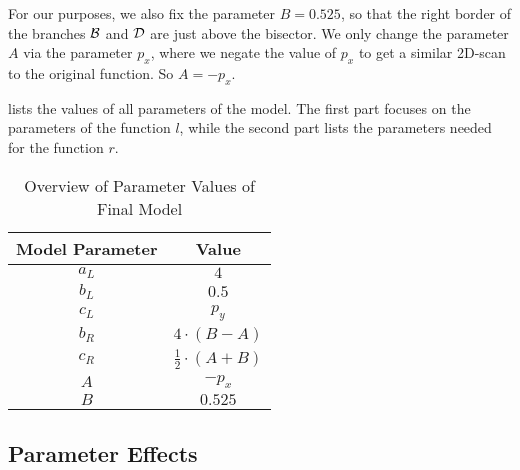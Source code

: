 For our purposes, we also fix the parameter $B = 0.525$, so that the right border of the branches $\mathcal{B}$ and $\mathcal{D}$ are just above the bisector.
We only change the parameter $A$ via the parameter $p_x$, where we negate the value of $p_x$ to get a similar 2D-scan to the original function.
So $A = -p_x$.

 lists the values of all parameters of the model.
The first part focuses on the parameters of the function $l$, while the second part lists the parameters needed for the function $r$.

\begin{table}
    \centering
    \begin{tabular}{|c|c|}
        \hline
        Model Parameter & Value                       \\ \hline \hline
        $a_L$           & $4$                         \\ \hline
        $b_L$           & $0.5$                       \\ \hline
        $c_L$           & $p_y$                       \\ \hline \hline
        $b_R$           & $4 \cdot (B - A)$           \\ \hline
        $c_R$           & $\frac{1}{2} \cdot (A + B)$ \\ \hline
        $A$             & $-p_x$                      \\ \hline
        $B$             & $0.525$                     \\ \hline
    \end{tabular}
    \caption{Overview of Parameter Values of Final Model}
    \label{tab:final.def.parameters.overview}
\end{table}

\subsection{Parameter Effects}

